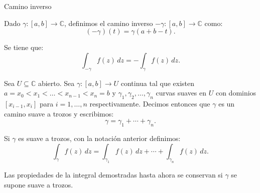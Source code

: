 \documentclass[spanish,presentation]{beamer}
\begin{document}
\begin{frame}[label=sec-1-4]{Camino inverso}
\begin{definition}
Dado \(\gamma\colon[a,b]\to \mathbb{C}\), definimos el \alert{camino
inverso} \(-\gamma\colon[a,b]\to\mathbb{C}\) como:
\begin{displaymath}
(-\gamma)(t)=\gamma(a+b-t).
\end{displaymath}
\end{definition}

\begin{block}{}
Se tiene que:
\begin{displaymath}
\int_{-\gamma}f(z)\,dz=-\int_{\gamma}f(z)\,dz.
\end{displaymath}
\end{block}
\end{frame}

\begin{frame}[label=sec-1-5]{}
\begin{definition}
Sea \(U\subseteq \mathbb{C}\) abierto. Sea \(\gamma\colon [a,b]\to
    U\) continua tal que existen
\(a=x_{0}<x_{1}<\ldots<x_{n-1}<x_{n}=b\) y 
\(\gamma_{1},\gamma_{2},\ldots,\gamma_{n}\) curvas suaves en \(U\)
con dominios \([x_{i-1},x_{i}]\) para \(i=1,\ldots,n\) respectivamente.
Decimos entonces que \(\gamma\) es un \alert{camino suave a trozos} y
escribimos:
\begin{displaymath}
\gamma=\gamma_{1}+\cdots+\gamma_{n}.
\end{displaymath}
\end{definition}

\begin{definition}
Si \(\gamma\) es suave a trozos, con la notación anterior
definimos:
\begin{displaymath}
\int_{\gamma}f(z)\,dz=\int_{\gamma_{1}}f(z)\,dz+\cdots+\int_{\gamma_{n}}f(z)\,dz.
\end{displaymath}
\end{definition}
\end{frame}

\begin{frame}[label=sec-1-6]{}
\begin{theorem}
Las propiedades de la integral demostradas hasta ahora se
conservan si \(\gamma\) se supone suave a trozos.
\end{theorem}
\end{frame}
\end{document}
